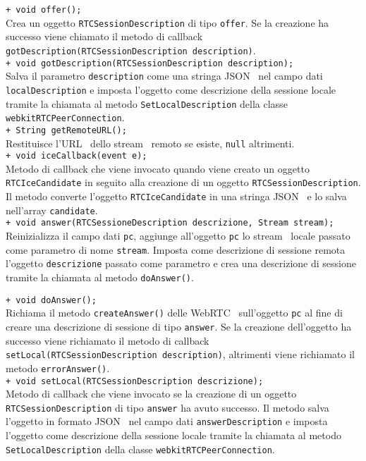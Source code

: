 {{\begin{sloppypar}
{{\begin{itemize}
{					\texttt{+ void offer();}\\
					Crea un oggetto \texttt{RTCSessionDescription} di tipo \texttt{offer}. Se la creazione ha successo viene chiamato il metodo di callback \texttt{gotDescription(RTCSessionDescription description)}.\\		
							
					\texttt{+ void gotDescription(RTCSessionDescription description);}\\
					Salva il parametro \texttt{description} come una stringa JSON\g~ nel campo dati \texttt{localDescription} e imposta l'oggetto come descrizione della sessione locale tramite la chiamata al metodo \texttt{SetLocalDescription} della classe \texttt{webkitRTCPeerConnection}.\\
					
					\texttt{+ String getRemoteURL();}\\
					Restituisce l'URL\g~ dello stream\g~ remoto se esiste, \texttt{null} altrimenti.\\
					
					\texttt{+ void iceCallback(event e);}\\
					Metodo di callback che viene invocato quando viene creato un oggetto \texttt{RTCIceCandidate} in seguito alla creazione di un oggetto \texttt{RTCSessionDescription}. Il metodo converte l'oggetto \texttt{RTCIceCandidate} in una stringa JSON\g~ e lo salva nell'array \texttt{candidate}.\\
					
					\texttt{+ void answer(RTCSessioneDescription descrizione, Stream stream);}\\
					Reinizializza il campo dati \texttt{pc}, aggiunge all'oggetto \texttt{pc} lo stream\g~ locale passato come parametro di nome \texttt{stream}. Imposta come descrizione di sessione remota l'oggetto \texttt{descrizione} passato come parametro e crea una descrizione di sessione tramite la chiamata al metodo \texttt{doAnswer()}.
					
					\texttt{+ void doAnswer();}\\
					Richiama il metodo \texttt{createAnswer()} delle WebRTC\g~ sull'oggetto \texttt{pc} al fine di creare una descrizione di sessione di tipo \texttt{answer}. Se la creazione dell'oggetto ha successo viene richiamato il metodo di callback \texttt{setLocal(RTCSessionDescription description)}, altrimenti viene richiamato il metodo \texttt{errorAnswer()}.\\
					
					\texttt{+ void setLocal(RTCSessionDescription descrizione);}\\
					Metodo di callback che viene invocato se la creazione di un oggetto \texttt{RTCSessionDescription} di tipo \texttt{answer} ha avuto successo. Il metodo salva l'oggetto in formato JSON\g~ nel campo dati \texttt{answerDescription} e imposta l'oggetto come descrizione della sessione locale tramite la chiamata al metodo \texttt{SetLocalDescription} della classe \texttt{webkitRTCPeerConnection}.\\

}
\end{itemize}}}
\end{sloppypar}}}
